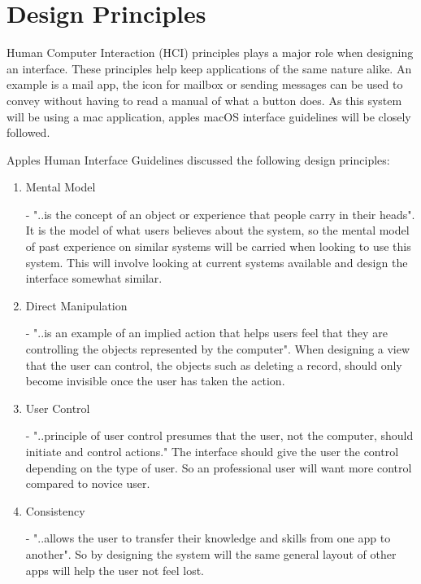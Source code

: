 \section{Design Principles}
Human Computer Interaction (HCI) principles plays a major role when designing an interface. These principles help keep applications of the same nature alike. An example is a mail app, the icon for mailbox or sending messages can be used to convey without having to read a manual of what a button does. As this system will be using a mac application, apples macOS interface guidelines will be closely followed.

Apples Human Interface Guidelines \cite{guidelines} discussed the following design principles:

\begin{enumerate}
  \item Mental Model 
  
  - "..is the concept of an object or experience that people carry in their heads". It is the model of what users believes about the system, so the mental model of past experience on similar systems will be carried when looking to use this system. This will involve looking at current systems available and design the interface somewhat similar.
  
  \item Direct Manipulation
  
  - "..is an example of an implied action that helps users feel that they are controlling the objects represented by the computer". When designing a view that the user can control, the objects such as deleting a record, should only become invisible once the user has taken the action.
  
  \item User Control 
  
  - "..principle of user control presumes that the user, not the computer, should initiate and control actions." The interface should give the user the control depending on the type of user. So an professional user will want more control compared to novice user.
  
  \item Consistency
  
  - "..allows the user to transfer their knowledge and skills from one app to another". So by designing the system will the same general layout of other apps will help the user not feel lost.
  
\end{enumerate}
